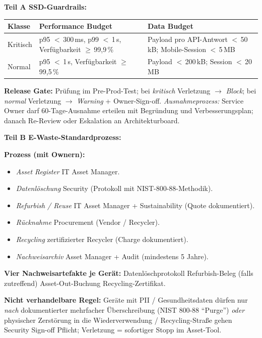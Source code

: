 \documentclass[11pt,a4paper,oneside]{article}
\begin{document}
\begin{loesungbox}
\textbf{Teil A \textendash{} SSD-Guardrails:}

\smallskip
\begin{tabularx}{\linewidth}{@{}p{2.4cm}p{4.0cm}X@{}}
\toprule
\textbf{Klasse} & \textbf{Performance Budget} & \textbf{Data Budget} \\
\midrule
Kritisch & p95 $<$\,300\,ms, p99 $<$\,1\,s, Verf\"ugbarkeit $\geq$\,99,9\,\% & Payload pro API-Antwort $<$\,50\,kB; Mobile-Session $<$\,5\,MB \\
Normal   & p95 $<$\,1\,s, Verf\"ugbarkeit $\geq$\,99,5\,\%                  & Payload $<$\,200\,kB; Session $<$\,20\,MB \\
\bottomrule
\end{tabularx}

\smallskip
\textbf{Release Gate:} Pr\"ufung im Pre-Prod-Test; bei \emph{kritisch} Verletzung $\rightarrow$ \emph{Block}; bei \emph{normal} Verletzung $\rightarrow$ \emph{Warning} + Owner-Sign-off. \emph{Ausnahmeprozess:} Service Owner darf 60-Tage-Ausnahme erteilen mit Begr\"undung und Verbesserungsplan; danach Re-Review oder Eskalation an Architekturboard.

\smallskip
\textbf{Teil B \textendash{} E-Waste-Standardprozess:}

\smallskip
\textbf{Prozess (mit Ownern):}
\begin{itemize}
  \item \emph{Asset Register} \textrightarrow{} IT Asset Manager.
  \item \emph{Datenl\"oschung} \textrightarrow{} Security (Protokoll mit NIST-800-88-Methodik).
  \item \emph{Refurbish / Reuse} \textrightarrow{} IT Asset Manager + Sustainability (Quote dokumentiert).
  \item \emph{R\"ucknahme} \textrightarrow{} Procurement (Vendor / Recycler).
  \item \emph{Recycling} \textrightarrow{} zertifizierter Recycler (Charge dokumentiert).
  \item \emph{Nachweisarchiv} \textrightarrow{} Asset Manager + Audit (mindestens 5 Jahre).
\end{itemize}

\smallskip
\textbf{Vier Nachweisartefakte je Ger\"at:} Datenl\"oschprotokoll \textperiodcentered{} Refurbish-Beleg (falls zutreffend) \textperiodcentered{} Asset-Out-Buchung \textperiodcentered{} Recycling-Zertifikat.

\smallskip
\textbf{Nicht verhandelbare Regel:} Ger\"ate mit PII / Gesundheitsdaten d\"urfen nur \emph{nach} dokumentierter mehrfacher \"Uberschreibung (NIST 800-88 ``Purge'') \emph{oder} physischer Zerst\"orung in die Wiederverwendung / Recycling-Stra{\ss}e gehen \textendash{} Security Sign-off Pflicht; Verletzung = sofortiger Stopp im Asset-Tool.
\end{loesungbox}
\end{document}
